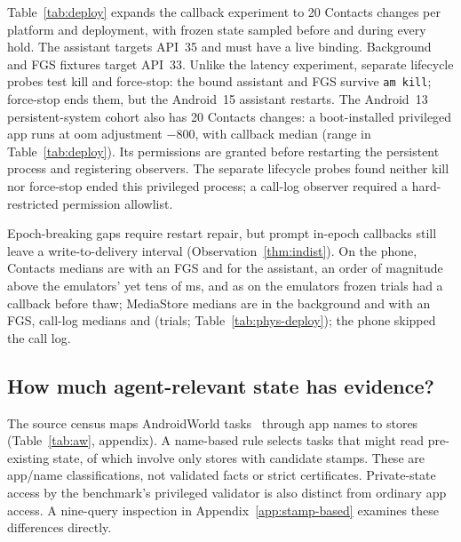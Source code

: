 

Table~\ref{tab:deploy} expands the callback experiment to 20 Contacts changes per platform and deployment, with frozen state sampled before and during every hold. The assistant targets API~35 and must have a live  binding. Background and FGS fixtures target API~33. Unlike the latency experiment, separate lifecycle probes test kill and force-stop: the bound assistant and FGS survive \texttt{am kill}; force-stop ends them, but the Android~15 assistant restarts. The Android~13 persistent-system cohort also has 20 Contacts changes: a boot-installed privileged app runs at oom adjustment $-800$, with callback median \FollowAPersist (range in Table~\ref{tab:deploy}). Its permissions are granted before restarting the persistent process and registering observers. The separate lifecycle probes found neither kill nor force-stop ended this privileged process; a call-log observer required a hard-restricted permission allowlist.


Epoch-breaking gaps require restart repair, but prompt in-epoch callbacks still leave a write-to-delivery interval (Observation~\ref{thm:indist}). On the phone, Contacts medians are \PhysDeployFgMedian with an FGS and \PhysDeployAssistMedian for the assistant, an order of magnitude above the emulators' yet tens of ms, and as on the emulators \PhysDeployFrozenBeforeThaw frozen trials had a callback before thaw; MediaStore medians are \PhysDeployMediaBgMedian in the background and \PhysDeployMediaFgMedian{} with an FGS\ifPhysCalllog, call-log medians \PhysDeployCalllogBgMedian and \PhysDeployCalllogFgMedian{}\fi{} (\PhysDeployTrials trials; Table~\ref{tab:phys-deploy})\ifPhysCalllog\else; the phone skipped the call log\fi.

\subsection{How much agent-relevant state has evidence?}
\label{sec:meas-aw}



The source census maps \AwTasks AndroidWorld tasks~\cite{rawles2025androidworld} through app names to stores (Table~\ref{tab:aw}, appendix). A name-based rule selects \AwRead tasks that might read pre-existing state, of which \AwReadWm involve only stores with candidate stamps. These are app/name classifications, not validated facts or strict certificates. Private-state access by the benchmark's privileged validator is also distinct from ordinary app access. A nine-query inspection in Appendix~\ref{app:stamp-based} examines these differences directly.
